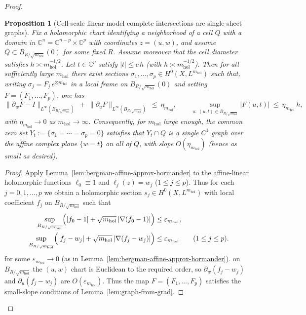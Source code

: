 \documentclass[11pt]{article}
\numberwithin{equation}{section}  %
\theoremstyle{plain}
\newtheorem{proposition}[theorem]{Proposition}
\theoremstyle{definition}
\theoremstyle{remark}
\newcommand{\C}{\mathbb{C}}
\newcommand{\mhol}{m_{\mathrm{hol}}} %
\begin{document}
\begin{proof}
\begin{proposition}[Cell-scale linear-model complete intersections are single-sheet graphs]
Fix a holomorphic chart identifying a neighborhood of a cell $Q$ with a domain in $\C^{n}=\C^{n-p}\times\C^{p}$ with coordinates $z=(u,w)$, and assume $Q\subset B_{R/\sqrt{\mhol}}(0)$ for some fixed $R$. Assume moreover that the cell diameter satisfies $h\asymp \mhol^{-1/2}$.
Let $t\in\C^p$ satisfy $|t|\le c\,h$ (with $h\asymp \mhol^{-1/2}$).
Then {for all sufficiently large $\mhol$ there exist sections} $\sigma_1,\dots,\sigma_p\in H^0(X,L^{\mhol})$ such that, writing
$\sigma_j=F_j\,e^{\otimes \mhol}$ in a local frame on $B_{R/\sqrt{\mhol}}(0)$ and setting $F=(F_1,\dots,F_p)$, one has
\[
\|\partial_w F-I\|_{L^\infty(B_{R/\sqrt{\mhol}})}\ +\ \|\partial_u F\|_{L^\infty(B_{R/\sqrt{\mhol}})}\ \le\ \eta_{\mhol},
\qquad
\sup_{u:\ (u,t)\in B_{R/\sqrt{\mhol}}} |F(u,t)|\ \le\ \eta_{\mhol}\,h,
\]
{with $\eta_{\mhol}\to 0$ as $\mhol\to\infty$.}
Consequently, for $\mhol$ large enough, the common zero set
$Y_t:=\{\sigma_1=\cdots=\sigma_p=0\}$ satisfies that $Y_t\cap Q$ is a \emph{single} $C^1$ graph over the affine complex plane
$\{w=t\}$ on all of $Q$, with slope $O(\eta_{\mhol})$ (hence as small as desired).
\end{proposition}

\begin{proof}

Apply Lemma~\ref{lem:bergman-affine-approx-hormander} to the affine-linear holomorphic functions
$\ell_0\equiv 1$ and $\ell_j(z)=w_j$ ($1\le j\le p$).  Thus for each $j=0,1,\dots,p$ we obtain a holomorphic section
$s_j\in H^0(X,L^{\mhol})$ with local coefficient $f_j$ on $B_{R/\sqrt{\mhol}}$ such that
\[
\begin{aligned}
	\sup_{B_{R/\sqrt{\mhol}}}\Bigl(|f_0-1|+\sqrt{\mhol}\,|\nabla(f_0-1)|\Bigr)
	&\le \varepsilon_{\mhol},\\
	\sup_{B_{R/\sqrt{\mhol}}}\Bigl(|f_j-w_j|+\sqrt{\mhol}\,|\nabla(f_j-w_j)|\Bigr)
	&\le \varepsilon_{\mhol}\qquad (1\le j\le p).
\end{aligned}
\]
for some $\varepsilon_{\mhol}\to 0$ (as in Lemma~\ref{lem:bergman-affine-approx-hormander}).
\noindent\textbf{} on $B_{R/\sqrt{\mhol}}$ the $(u,w)$ chart is Euclidean to the required order, so $\partial_w(f_j-w_j)$ and $\partial_u(f_j-w_j)$ are $O(\varepsilon_{\mhol})$. Thus the map $F=(F_1,\dots,F_p)$ satisfies the small-slope conditions of Lemma~\ref{lem:graph-from-grad}.\par



\end{proof}
\end{proof}
\end{document}
